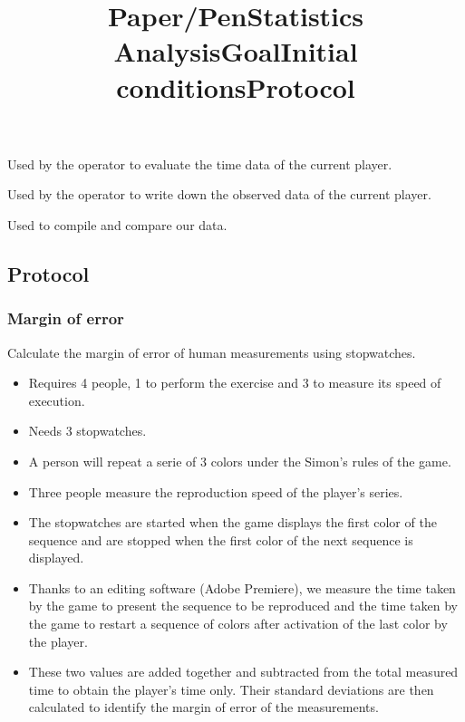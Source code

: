 \documentclass[12pt, openany, twocolumn]{article}
\begin{document}
        \noindent Used by the operator to evaluate the time data of the current player. \\

        \noindent \title{\textbf{Paper/Pen}} \vspace{0.25cm}

        \noindent Used by the operator to write down the observed data of the current player. \\
    
        \noindent \title{\textbf{Statistics Analysis}} \vspace{0.25cm}

        \noindent Used to compile and compare our data.

    \subsection{Protocol}
        \subsubsection{Margin of error}
            \title{\textbf{Goal}} \vspace{0.25cm}

            \noindent Calculate the margin of error of human measurements using stopwatches.
            \\

            \noindent \title{\textbf{Initial conditions}}
                \begin{itemize}
                \renewcommand\labelitemi{--}
                    \item{Requires 4 people, 1 to perform the exercise and 3 to measure its speed of execution.}
                    \item{Needs 3 stopwatches.}
                \end{itemize}

            \noindent \title{\textbf{Protocol}}
                \begin{itemize}
                \renewcommand\labelitemi{--}
                    \item{A person will repeat a serie of 3 colors under the Simon's rules of the game.}
                    \item{Three people measure the reproduction speed of the player's series.}
                    \item{The stopwatches are started when the game displays the first color of the sequence and are stopped when the first color of the next sequence is displayed.}
                    \item{Thanks to an editing software (Adobe Premiere), we measure the time taken by the game to present the sequence to be reproduced and the time taken by the game to restart a sequence of colors after activation of the last color by the player.}
                    \item{These two values are added together and subtracted from the total measured time to obtain the player's time only. Their standard deviations are then calculated to identify the margin of error of the measurements.}
                \end{itemize}
                
\end{document}
